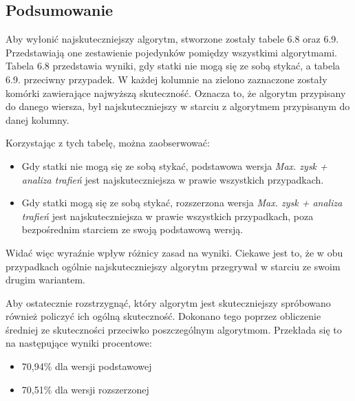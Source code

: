 \subsection{Podsumowanie}

Aby wyłonić najskuteczniejszy algorytm, stworzone zostały tabele 6.8 oraz 6.9. Przedstawiają one zestawienie pojedynków pomiędzy wszystkimi algorytmami. Tabela 6.8 przedstawia wyniki, gdy statki nie mogą się ze sobą stykać, a tabela 6.9. przeciwny przypadek. W każdej kolumnie na zielono zaznaczone zostały komórki zawierające najwyższą skuteczność. Oznacza to, że algorytm przypisany do danego wiersza, był najskuteczniejszy w starciu z algorytmem przypisanym do danej kolumny.

Korzystając z tych tabelę, można zaobserwować:

\begin{itemize}
    \item Gdy statki nie mogą się ze sobą stykać, podstawowa wersja  \emph{Max. zysk + analiza trafień} jest najskuteczniejsza w prawie wszystkich przypadkach. 
    \item Gdy statki mogą się ze sobą stykać, rozszerzona wersja  \emph{Max. zysk + analiza trafień} jest najskuteczniejsza w prawie wszystkich przypadkach, poza bezpośrednim starciem ze swoją podstawową wersją.
\end{itemize}

Widać więc wyraźnie wpływ różnicy zasad na wyniki. Ciekawe jest to, że w obu przypadkach ogólnie najskuteczniejszy algorytm przegrywał w starciu ze swoim drugim wariantem.

Aby ostatecznie rozstrzygnąć, który algorytm jest skuteczniejszy spróbowano również policzyć ich ogólną skuteczność. Dokonano tego poprzez obliczenie średniej ze skuteczności przeciwko poszczególnym algorytmom. Przekłada się to na następujące wyniki procentowe:

\begin{itemize}
    \item 70,94\% dla wersji podstawowej
    \item 70,51\% dla wersji rozszerzonej
\end{itemize}

